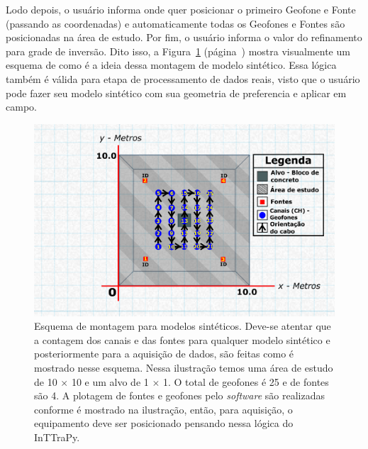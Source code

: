 \documentclass[a4paper, 12 pt]{article} %
\begin{document}
Lodo depois, o usuário informa onde quer posicionar o primeiro Geofone e Fonte (passando as coordenadas) e automaticamente todas os Geofones e Fontes são posicionadas na área de estudo. Por fim, o usuário informa o valor do refinamento para grade de inversão. Dito isso, a Figura~\ref{montagem_geometria} (página~\pageref{montagem_geometria}) mostra visualmente um esquema de como é a ideia dessa montagem de modelo sintético. Essa lógica também é válida para etapa de processamento de dados reais, visto que o usuário pode fazer seu modelo sintético com sua geometria de preferencia e aplicar em campo.


\begin{figure}[!hbtp]
	\begin{center}
		\includegraphics[scale=0.65]{Figuras/geometria.png}
	\end{center}
	\caption{Esquema de montagem para modelos sintéticos. Deve-se atentar que a contagem dos canais e das fontes para qualquer modelo sintético e posteriormente para a aquisição de dados, são feitas como é mostrado nesse esquema. Nessa ilustração temos uma área de estudo de 10 $\times$ 10 e um alvo de 1 $\times$ 1. O total de geofones é 25 e de fontes são 4. A plotagem de fontes e geofones pelo \textit{software} são realizadas conforme é mostrado na ilustração, então, para aquisição, o equipamento deve ser posicionado pensando nessa lógica do InTTraPy.}
	\label{montagem_geometria}
\end{figure} \newpage
\end{document}
